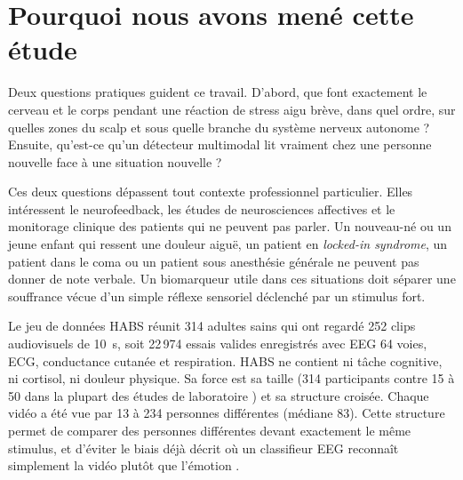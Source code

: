 \documentclass[10pt]{article}
\begin{document}
\begin{abstract}
développement et 0,656 contre les essais relaxés). Les ondes PR et les classifieurs non linéaires (GBDT et MLP) n'améliorent pas la généralisation sur de nouveaux thèmes.
\end{abstract}

\section{Pourquoi nous avons mené cette étude}

Deux questions pratiques guident ce travail. D'abord, que font exactement le cerveau et le corps pendant une réaction de stress aigu brève, dans quel ordre, sur quelles zones du scalp et sous quelle branche du système nerveux autonome ? Ensuite, qu'est-ce qu'un détecteur multimodal lit vraiment chez une personne nouvelle face à une situation nouvelle ?

Ces deux questions dépassent tout contexte professionnel particulier. Elles intéressent le neurofeedback, les études de neurosciences affectives et le monitorage clinique des patients qui ne peuvent pas parler. Un nouveau-né ou un jeune enfant qui ressent une douleur aiguë, un patient en \emph{locked-in syndrome}, un patient dans le coma ou un patient sous anesthésie générale ne peuvent pas donner de note verbale. Un biomarqueur utile dans ces situations doit séparer une souffrance vécue d'un simple réflexe sensoriel déclenché par un stimulus fort.

Le jeu de données HABS réunit 314 adultes sains qui ont regardé 252 clips audiovisuels de 10~s, soit 22\,974 essais valides enregistrés avec EEG 64 voies, ECG, conductance cutanée et respiration. HABS ne contient ni tâche cognitive, ni cortisol, ni douleur physique. Sa force est sa taille (314 participants contre 15 à 50 dans la plupart des études de laboratoire \cite{palomba2000,hagenaars2014,schubring2019}) et sa structure croisée. Chaque vidéo a été vue par 13 à 234 personnes différentes (médiane 83). Cette structure permet de comparer des personnes différentes devant exactement le même stimulus, et d'éviter le biais déjà décrit où un classifieur EEG reconnaît simplement la vidéo plutôt que l'émotion \cite{giannakakis2015,gerster2026}.
\end{document}
